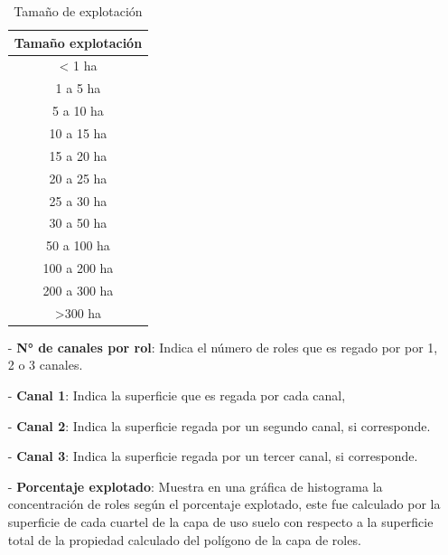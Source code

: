\documentclass[10pt]{article}
\begin{document}
\begin{itemize}
\begin{table}[H]
\centering
\caption{Tamaño de explotación}
\label{cuadro3}
\begin{tabular}{@{}c@{}}
\toprule
\textbf{Tamaño explotación} \\ \midrule
< 1 ha                      \\
1 a 5 ha                    \\
5 a 10 ha                   \\
10 a 15 ha                  \\
15 a 20 ha                  \\
20 a 25 ha                  \\
25 a 30 ha                  \\
30 a 50 ha                  \\
50 a 100 ha                 \\
100 a 200 ha                \\
200 a 300 ha                \\
>300 ha                     \\ \bottomrule
\end{tabular}
\end{table}
 
 \item[-]\textbf{N° de canales por rol}: Indica el número de roles que es regado por por 1, 2 o 3 canales.
 \item[-]\textbf{Canal 1}: Indica la superficie que es regada por cada canal,
 \item[-]\textbf{Canal 2}: Indica la superficie regada por un segundo canal, si corresponde.
 \item[-]\textbf{Canal 3}: Indica la superficie regada por un tercer canal, si corresponde.
 \item[-]\textbf{Porcentaje explotado}: Muestra en una gráfica de histograma la concentración de roles según el porcentaje explotado, este fue calculado por la superficie de cada cuartel de la capa de uso suelo con respecto a la superficie total de la propiedad calculado del polígono de la capa de roles.  
 

\end{itemize}
\end{document}
